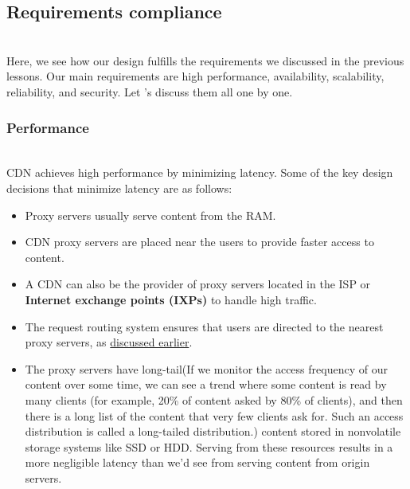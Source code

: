 

\subsection{Requirements compliance}\label{SasVMLw-TVat8uPyZZb-c}
\\
Here, we see how our design fulfills the requirements we discussed in the previous lessons. Our main requirements are high performance, availability, scalability, reliability, and security. Let 's discuss them all one by one.

\subsubsection{Performance}\label{Qp04paCoefykvXxqV-aTN}
\\
CDN achieves high performance by minimizing latency. Some of the key design decisions that minimize latency are as follows:

\begin{itemize}
\item
\protect{}\label{FZEK9zKH4ZjNwENmbt1hQ}
Proxy servers usually serve content from the RAM.
\item
\protect{}\label{UoCMR8KRFIpIjdO3AyQwg}
CDN proxy servers are placed near the users to provide faster access to content.
\item
\protect{}\label{orSB4_ZKAqv4LGUU0qm9w}
A CDN can also be the provider of proxy servers located in the ISP or \textbf{Internet exchange points (IXPs)} to handle high traffic.
\item
\protect{}\label{W9uuAtePlMqrZGICFHqYr}
The request routing system ensures that users are directed to the nearest proxy servers, as \href{https://www.educative.io/courses/grokking-the-system-design-interview/design-of-a-cdn\#CDN-components}{discussed earlier}.
\item
\protect{}\label{LKBa3iQKDAJVqlk0S3Hnc}
The proxy servers have long-tail(If we monitor the access frequency of our content over some time, we can see a trend where some content is read by many clients (for example, 20\% of content asked by 80\% of clients), and then there is a long list of the content that very few clients ask for. Such an access distribution is called a long-tailed distribution.) content stored in nonvolatile storage systems like SSD or HDD. Serving from these resources results in a more negligible latency than we'd see from serving content from origin servers.
\end{itemize}

